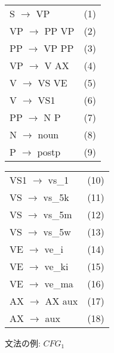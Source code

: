 \begin{figure}[htbp]
  \begin{center}

    \begin{tabular}[t]{lc}
      S $\rightarrow$ VP & (1) \\[-1mm]
      VP $\rightarrow$ PP VP & (2) \\[-1mm]
      PP $\rightarrow$ VP PP & (3) \\[-1mm]
      VP $\rightarrow$ V AX  & (4) \\[-1mm]
      V  $\rightarrow$ VS VE & (5) \\[-1mm]
      V  $\rightarrow$ VS1   & (6) \\[-1mm]
      PP $\rightarrow$ N P   & (7) \\[-1mm]
      N $\rightarrow$ noun   & (8) \\[-1mm]
      P $\rightarrow$ postp  & (9) \\
    \end{tabular}
    \hspace*{20mm}
    \begin{tabular}[t]{lc}
      VS1 $\rightarrow$ vs\_1 & (10) \\[-1mm]
      VS $\rightarrow$ vs\_5k & (11) \\[-1mm]
      VS $\rightarrow$ vs\_5m & (12) \\[-1mm]
      VS $\rightarrow$ vs\_5w & (13) \\[-1mm]
      VE $\rightarrow$ ve\_i  & (14) \\[-1mm]
      VE $\rightarrow$ ve\_ki & (15) \\[-1mm]
      VE $\rightarrow$ ve\_ma & (16) \\[-1mm]
      AX $\rightarrow$ AX aux & (17) \\[-1mm]
      AX $\rightarrow$ aux    & (18) \\
    \end{tabular}

    \bigskip

    \caption{文法の例: $CFG_1$}
    \label{fig:lalr_gra}
  \end{center}
\end{figure}

